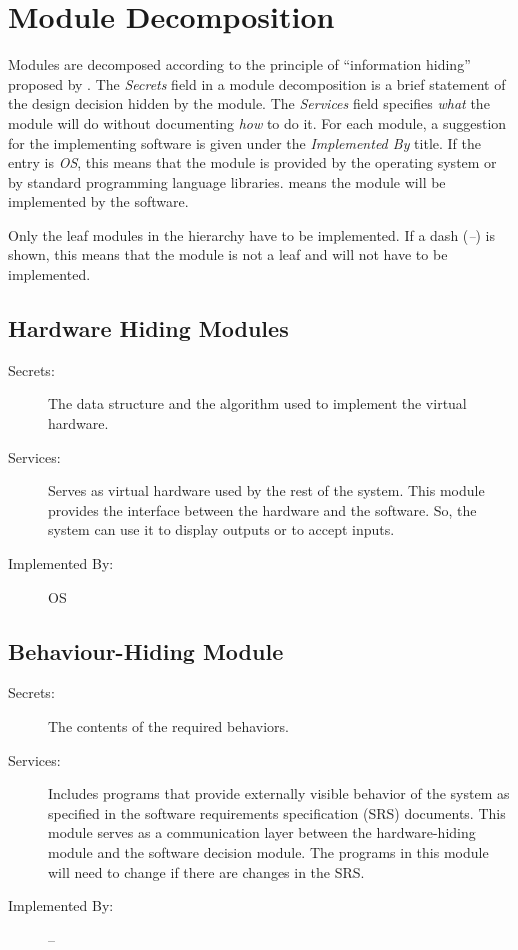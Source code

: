 \documentclass[12pt, titlepage]{article}
\begin{document}
\section{Module Decomposition} \label{SecMD}

Modules are decomposed according to the principle of ``information hiding''
proposed by \citet{ParnasEtAl1984}. The \emph{Secrets} field in a module
decomposition is a brief statement of the design decision hidden by the
module. The \emph{Services} field specifies \emph{what} the module will do
without documenting \emph{how} to do it. For each module, a suggestion for the
implementing software is given under the \emph{Implemented By} title. If the
entry is \emph{OS}, this means that the module is provided by the operating
system or by standard programming language libraries.  \emph{\progname{}} means the
module will be implemented by the \progname{} software.

Only the leaf modules in the hierarchy have to be implemented. If a dash
(\emph{--}) is shown, this means that the module is not a leaf and will not have
to be implemented. 

\subsection{Hardware Hiding Modules }

\begin{description}
\item[Secrets:]The data structure and the algorithm used to implement the virtual
  hardware.
\item[Services:]Serves as virtual hardware used by the rest of the
  system. This module provides the interface between the hardware and the
  software. So, the system can use it to display outputs or to accept inputs.
\item[Implemented By:] OS
\end{description}

\subsection{Behaviour-Hiding Module}

\begin{description}
\item[Secrets:]The contents of the required behaviors.
\item[Services:]Includes programs that provide externally visible behavior of
  the system as specified in the software requirements specification (SRS)
  documents. This module serves as a communication layer between the
  hardware-hiding module and the software decision module. The programs in this
  module will need to change if there are changes in the SRS.
\item[Implemented By:] --
\end{description}
\end{document}
